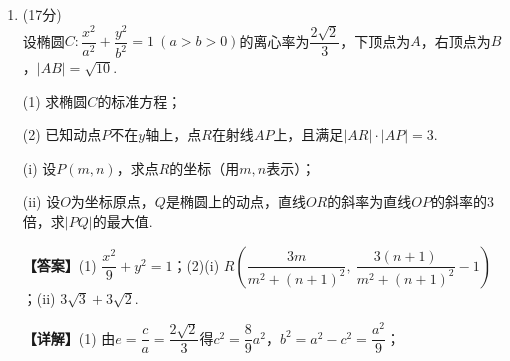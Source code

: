 \documentclass[12pt,a4paper]{article}
\begin{document}
\begin{enumerate}[leftmargin=*,label=\arabic*.,resume,itemsep=1.2ex]
		\textbf{【详解】}(1) 在四棱锥中，$PA\perp$平面$ABCD$，$AB\subset$平面$ABCD$，$AD\subset$平面$ABCD$，
		
		所以$PA\perp AB$，$PA\perp AD$.
		
		又$AB\perp AD$，$PA\cap AD=A$，
		
		所以$AB\perp$平面$PAD$；
		
		又$AB\subset$平面$PAB$，
		
		所以平面$PAB\perp$平面$PAD$.
		
		(2)(i) 以$A$为原点，$AB,AD,AP$分别为$x,y,z$轴建系，
		
		则$B(\sqrt2,0,0)$，$C(\sqrt2,2,0)$，$D(0,1+\sqrt3,0)$，$P(0,0,\sqrt2)$.
		
		设球心$O(x,y,z)$.
		
		由$|OB|=|OC|$得$y=1$；
		
		由$|OB|=|OP|$得$x=0$；
		
		此时$|OB|^2=3$，且$|OD|^2=(1+\sqrt3-1)^2=3$，
		
		即$O(0,1,0)$到$P,B,C,D$距离相等，
		
		故球心$O$在平面$ABCD$内.
		
		(ii) $\overrightarrow{AC}=(\sqrt2,2,0)$，$\overrightarrow{PO}=(0,1,-\sqrt2)$，
		
		设所成角为$\theta$，
		
		则
		\[
		\cos\theta=\frac{|\overrightarrow{AC}\cdot\overrightarrow{PO}|}{|\overrightarrow{AC}||\overrightarrow{PO}|}=\frac{2}{\sqrt6\times\sqrt3}=\frac{\sqrt2}{3}.
		\]
		
		\item (17分)\\
		设椭圆$C:\dfrac{x^2}{a^2}+\dfrac{y^2}{b^2}=1\ (a>b>0)$的离心率为$\dfrac{2\sqrt2}{3}$，下顶点为$A$，右顶点为$B$，$|AB|=\sqrt{10}$.
		
		(1) 求椭圆$C$的标准方程；
		
		(2) 已知动点$P$不在$y$轴上，点$R$在射线$AP$上，且满足$|AR|\cdot|AP|=3$.
		
		\hspace*{2em}(i) 设$P(m,n)$，求点$R$的坐标（用$m,n$表示）；
		
		\hspace*{2em}(ii) 设$O$为坐标原点，$Q$是椭圆上的动点，直线$OR$的斜率为直线$OP$的斜率的$3$倍，求$|PQ|$的最大值.
		
		\textbf{【答案】}(1) $\dfrac{x^2}{9}+y^2=1$；(2)(i) $R\left(\dfrac{3m}{m^2+(n+1)^2},\ \dfrac{3(n+1)}{m^2+(n+1)^2}-1\right)$；(ii) $3\sqrt3+3\sqrt2$.
		
		\textbf{【详解】}(1) 由$e=\dfrac{c}{a}=\dfrac{2\sqrt2}{3}$得$c^2=\dfrac89a^2$，$b^2=a^2-c^2=\dfrac{a^2}{9}$；
		

\end{enumerate}
\end{document}
